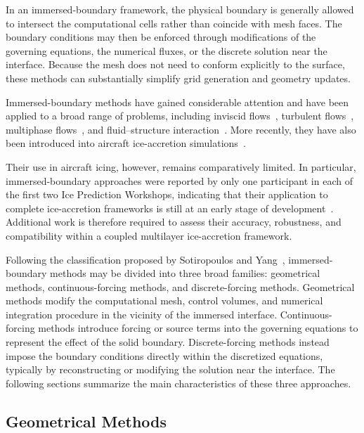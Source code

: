In an immersed-boundary framework, the physical boundary is generally allowed to intersect the computational cells rather than coincide with mesh faces. The boundary conditions may then be enforced through modifications of the governing equations, the numerical fluxes, or the discrete solution near the interface. Because the mesh does not need to conform explicitly to the surface, these methods can substantially simplify grid generation and geometry updates.

Immersed-boundary methods have gained considerable attention and have been applied to a broad range of problems, including inviscid flows~\cite{inviscidIBM31,inviscidIBM47}, turbulent flows~\cite{turbulentIBM73,turbulentIBM170}, multiphase flows~\cite{multiphaseIBM127, multiphaseIBM184}, and fluid–structure interaction~\cite{fsiIBM72, fsiIBM174, fsiIBM191}. More recently, they have also been introduced into aircraft ice-accretion simulations~\cite{pabloIcing,lavoieLevelSet,CapizzanoIBM34,CapizzanoIBM34}.

Their use in aircraft icing, however, remains comparatively limited. In particular, immersed-boundary approaches were reported by only one participant in each of the first two Ice Prediction Workshops, indicating that their application to complete ice-accretion frameworks is still at an early stage of development~\cite{laurendeau2022summary,laurendeau2024summary}. Additional work is therefore required to assess their accuracy, robustness, and compatibility within a coupled multilayer ice-accretion framework.

Following the classification proposed by Sotiropoulos and Yang~\cite{sotiropoulos2014immersed}, immersed-boundary methods may be divided into three broad families: geometrical methods, continuous-forcing methods, and discrete-forcing methods. Geometrical methods modify the computational mesh, control volumes, and numerical integration procedure in the vicinity of the immersed interface. Continuous-forcing methods introduce forcing or source terms into the governing equations to represent the effect of the solid boundary. Discrete-forcing methods instead impose the boundary conditions directly within the discretized equations, typically by reconstructing or modifying the solution near the interface. The following sections summarize the main characteristics of these three approaches.

\subsection{Geometrical Methods}

